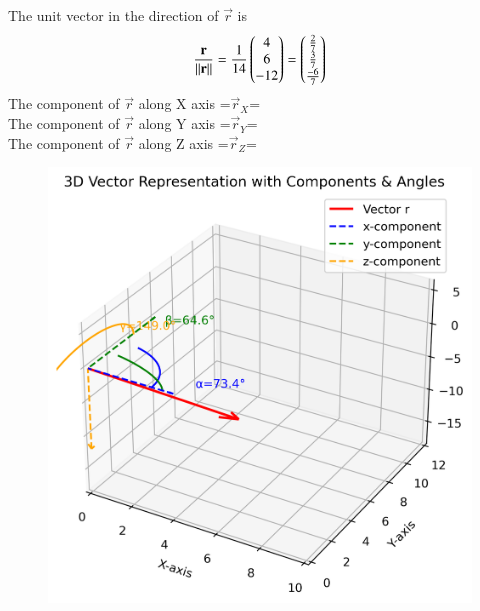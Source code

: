 \documentclass[journal]{IEEEtran}
\begin{document}
The unit  vector in the direction of $\vec{r}$  is
\begin{align}
    \frac{\mathbf{r}}{\left\lVert\mathbf{r}\right\rVert} &= \frac{1}{14}\begin{pmatrix}4\\6\\-12\end{pmatrix} = \begin{pmatrix}\frac{2}{7}\\\frac{3}{7}\\\frac{-6}{7}\end{pmatrix}\\
    \end{align}
The component of $\vec{r}$ along X axis =$\vec{r}_X$=\\
The component of $\vec{r}$ along Y axis =$\vec{r}_Y$=\\
The component of $\vec{r}$ along Z axis =$\vec{r}_Z$=\\
\begin{figure}[h!]
   \centering
   \includegraphics[width=0.5\columnwidth]{figs/01.png}
   \caption{}
   \label{}
\end{figure}
\end{document}
